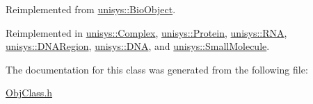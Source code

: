 Reimplemented from \hyperlink{classunisys_1_1BioObject_a0437fcc7976ff9e8dc5ce77246c06f71}{unisys\-::\-Bio\-Object}.



Reimplemented in \hyperlink{classunisys_1_1Complex_a63e019fcca3e2d919937694678d9ee1f}{unisys\-::\-Complex}, \hyperlink{classunisys_1_1Protein_a41d52894afce9bd0f7f047ac560f38cf}{unisys\-::\-Protein}, \hyperlink{classunisys_1_1RNA_abeb5db8942c0d2ecac49086d50d6e7ab}{unisys\-::\-R\-N\-A}, \hyperlink{classunisys_1_1DNARegion_a213d2340cc8f4172e3f220f1fe9883f1}{unisys\-::\-D\-N\-A\-Region}, \hyperlink{classunisys_1_1DNA_aa33eff29fbf57aa7c626999ade40910d}{unisys\-::\-D\-N\-A}, and \hyperlink{classunisys_1_1SmallMolecule_a0f0da371544569163782603ace820d0a}{unisys\-::\-Small\-Molecule}.



The documentation for this class was generated from the following file\-:\begin{DoxyCompactItemize}
\item 
\hyperlink{ObjClass_8h}{Obj\-Class.\-h}\end{DoxyCompactItemize}
